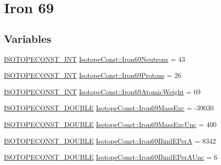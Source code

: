 \hypertarget{group___isotope_const-_iron-_fe69}{}\section{Iron 69}
\label{group___isotope_const-_iron-_fe69}
\subsection*{Variables}
\begin{DoxyCompactItemize}
\item 
\mbox{\hyperlink{group___isotope_const-_macros_ga5f18360b3e99483a35c32d789e62621c}{I\+S\+O\+T\+O\+P\+E\+C\+O\+N\+S\+T\+\_\+\+I\+NT}} \mbox{\hyperlink{group___isotope_const-_iron-_fe69_ga3a6bb23cf686ee8bae5cb1d8ecaaf9b3}{Isotope\+Const\+::\+Iron69\+Neutrons}} = 43
\item 
\mbox{\hyperlink{group___isotope_const-_macros_ga5f18360b3e99483a35c32d789e62621c}{I\+S\+O\+T\+O\+P\+E\+C\+O\+N\+S\+T\+\_\+\+I\+NT}} \mbox{\hyperlink{group___isotope_const-_iron-_fe69_ga88da3870d42d0789f1129b89ef78ef34}{Isotope\+Const\+::\+Iron69\+Protons}} = 26
\item 
\mbox{\hyperlink{group___isotope_const-_macros_ga5f18360b3e99483a35c32d789e62621c}{I\+S\+O\+T\+O\+P\+E\+C\+O\+N\+S\+T\+\_\+\+I\+NT}} \mbox{\hyperlink{group___isotope_const-_iron-_fe69_ga00dc515f69ade108a8c647a7ef464e2b}{Isotope\+Const\+::\+Iron69\+Atomic\+Weight}} = 69
\item 
\mbox{\hyperlink{group___isotope_const-_macros_ga8f45a7272ce02c0b4c65c44636ed719a}{I\+S\+O\+T\+O\+P\+E\+C\+O\+N\+S\+T\+\_\+\+D\+O\+U\+B\+LE}} \mbox{\hyperlink{group___isotope_const-_iron-_fe69_ga2b1fc466f9bab21f2cb8f18436b79008}{Isotope\+Const\+::\+Iron69\+Mass\+Exc}} = -\/39030
\item 
\mbox{\hyperlink{group___isotope_const-_macros_ga8f45a7272ce02c0b4c65c44636ed719a}{I\+S\+O\+T\+O\+P\+E\+C\+O\+N\+S\+T\+\_\+\+D\+O\+U\+B\+LE}} \mbox{\hyperlink{group___isotope_const-_iron-_fe69_ga04de5f66e578598bd93490f76d42a4e3}{Isotope\+Const\+::\+Iron69\+Mass\+Exc\+Unc}} = 400
\item 
\mbox{\hyperlink{group___isotope_const-_macros_ga8f45a7272ce02c0b4c65c44636ed719a}{I\+S\+O\+T\+O\+P\+E\+C\+O\+N\+S\+T\+\_\+\+D\+O\+U\+B\+LE}} \mbox{\hyperlink{group___isotope_const-_iron-_fe69_ga4b0a98bbee2cff1825d06cb8c76ef7f8}{Isotope\+Const\+::\+Iron69\+Bind\+E\+PerA}} = 8342
\item 
\mbox{\hyperlink{group___isotope_const-_macros_ga8f45a7272ce02c0b4c65c44636ed719a}{I\+S\+O\+T\+O\+P\+E\+C\+O\+N\+S\+T\+\_\+\+D\+O\+U\+B\+LE}} \mbox{\hyperlink{group___isotope_const-_iron-_fe69_ga8f12ada085f7910133049afe3f4fcb50}{Isotope\+Const\+::\+Iron69\+Bind\+E\+Per\+A\+Unc}} = 6

\end{DoxyCompactItemize}
